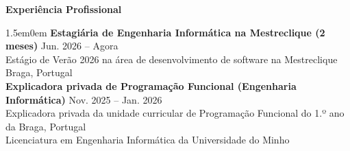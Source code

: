 \noindent\textbf{Experiência Profissional}
\noindent\hrulefill
\vspace{0.25em}
\begin{adjustwidth}{1.5em}{0em}
\textbf{Estagiária de Engenharia Informática na Mestreclique (2 meses)} \hfill Jun. 2026 -- Agora \\
Estágio de Verão 2026 na área de desenvolvimento de software na Mestreclique \hfill Braga, Portugal
\vspace{0.5em}
\\
\textbf{Explicadora privada de Programação Funcional (Engenharia Informática)} \hfill Nov. 2025 -- Jan. 2026 \\
Explicadora privada da unidade curricular de Programação Funcional
do 1.º ano da \hfill Braga, Portugal \\
Licenciatura em Engenharia Informática da Universidade
do Minho
\end{adjustwidth}
\vspace{0.25em}